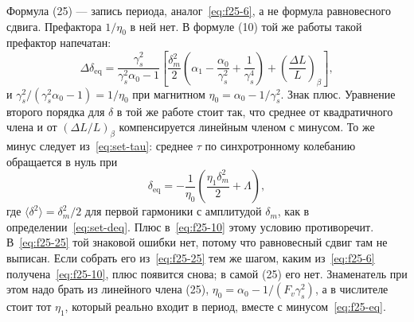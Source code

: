 Формула (25) --- запись периода, аналог~\eqref{eq:f25-6}, а не формула равновесного сдвига. Префактора $1/\eta_0$ в ней нет. В формуле (10) той же работы такой префактор напечатан:
\begin{equation}
\label{eq:f25-10}
\Delta\delta_{\mathrm{eq}}
=
\frac{\gamma_s^2}{\gamma_s^2\alpha_0-1}
\left[
\frac{\delta_m^2}{2}
\left(\alpha_1-\frac{\alpha_0}{\gamma_s^2}+\frac{1}{\gamma_s^4}\right)
+
\left(\frac{\Delta L}{L}\right)_{\!\beta}
\right],
\end{equation}
и $\gamma_s^2/(\gamma_s^2\alpha_0-1)=1/\eta_0$ при магнитном $\eta_0=\alpha_0-1/\gamma_s^2$. Знак плюс. Уравнение второго порядка для $\delta$ в той же работе стоит так, что среднее от квадратичного члена и от $(\Delta L/L)_\beta$ компенсируется линейным членом с минусом. То же минус следует из~\eqref{eq:set-tau}: среднее $\tau$ по синхротронному колебанию обращается в нуль при
\begin{equation}
\label{eq:f25-eq}
\delta_{\mathrm{eq}}
=
-\frac{1}{\eta_0}
\left(
\frac{\eta_1\delta_m^2}{2}
+
\Lambda
\right),
\end{equation}
где $\langle\delta^2\rangle=\delta_m^2/2$ для первой гармоники с амплитудой $\delta_m$, как в определении~\eqref{eq:set-deq}. Плюс в~\eqref{eq:f25-10} этому условию противоречит. В~\eqref{eq:f25-25} той знаковой ошибки нет, потому что равновесный сдвиг там не выписан. Если собрать его из~\eqref{eq:f25-25} тем же шагом, каким из~\eqref{eq:f25-6} получена~\eqref{eq:f25-10}, плюс появится снова; в самой (25) его нет. Знаменатель при этом надо брать из линейного члена (25), $\eta_0=\alpha_0-1/(F_v\gamma_s^2)$, а в числителе стоит тот $\eta_1$, который реально входит в период, вместе с минусом~\eqref{eq:f25-eq}.
